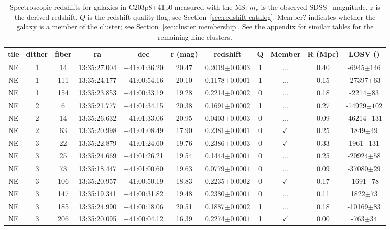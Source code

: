 \begin{table}
	\centering \caption{Spectroscopic redshifts for galaxies in C203p8+41p0 measured with the MS: $m_r$ is the observed SDSS \sdssr\ magnitude. $z$ is the derived redshift. $Q$ is the redshift quality flag; see Section~\ref{sec:redshift catalog}. Member? indicates whether the galaxy is a member of the cluster; see Section~\ref{sec:cluster membership}. See the appendix for similar tables for the remaining nine clusters.} 
	\begin{tabular}{ccccccccccc} 
		\hline 
		tile & dither & fiber & ra & dec & r (mag) & redshift & Q & Member & R (Mpc) & LOSV (\kms) \\
		\hline \hline 
		NE & 1 & 14 & 13:35:27.004 & +41:01:36.20 & 20.47 & 0.2019$\pm{0.0003}$ & 1 & ... & 0.40 & -6945$\pm{146}$ \\
		NE & 1 & 111 & 13:35:24.177 & +41:00:54.16 & 20.10 & 0.1178$\pm{0.0001}$ & 1 & ... & 0.15 & -27397$\pm{63}$ \\
		NE & 1 & 154 & 13:35:23.853 & +41:00:33.19 & 19.28 & 0.2214$\pm{0.0002}$ & 0 & ... & 0.18 & -2214$\pm{83}$ \\
		NE & 2 & 6 & 13:35:21.777 & +41:01:34.15 & 20.38 & 0.1691$\pm{0.0002}$ & 1 & ... & 0.27 & -14929$\pm{102}$ \\
		NE & 2 & 14 & 13:35:26.632 & +41:01:33.06 & 20.95 & 0.0403$\pm{0.0003}$ & 0 & ... & 0.09 & -46214$\pm{131}$ \\
		NE & 2 & 63 & 13:35:20.998 & +41:01:08.49 & 17.90 & 0.2381$\pm{0.0001}$ & 0 & $\checkmark$ & 0.25 & 1849$\pm{49}$ \\
		NE & 3 & 22 & 13:35:22.879 & +41:01:24.60 & 19.76 & 0.2386$\pm{0.0003}$ & 0 & $\checkmark$ & 0.33 & 1961$\pm{131}$ \\
		NE & 3 & 25 & 13:35:24.669 & +41:01:26.21 & 19.54 & 0.1444$\pm{0.0001}$ & 0 & ... & 0.25 & -20924$\pm{58}$ \\
		NE & 3 & 73 & 13:35:18.447 & +41:01:00.60 & 19.63 & 0.0779$\pm{0.0001}$ & 0 & ... & 0.09 & -37080$\pm{29}$ \\
		NE & 3 & 106 & 13:35:20.957 & +41:00:50.19 & 18.83 & 0.2235$\pm{0.0002}$ & 0 & $\checkmark$ & 0.17 & -1691$\pm{78}$ \\
		NE & 3 & 147 & 13:35:19.341 & +41:00:31.82 & 19.48 & 0.2380$\pm{0.0001}$ & 0 & ... & 0.11 & 1822$\pm{73}$ \\
		NE & 3 & 185 & 13:35:24.990 & +41:00:18.06 & 20.51 & 0.1887$\pm{0.0002}$ & 1 & ... & 0.18 & -10169$\pm{83}$ \\
		NE & 3 & 206 & 13:35:20.095 & +41:00:04.12 & 16.39 & 0.2274$\pm{0.0001}$ & 1 & $\checkmark$ & 0.00 & -763$\pm{34}$ \\

\end{tabular}
\end{table}
